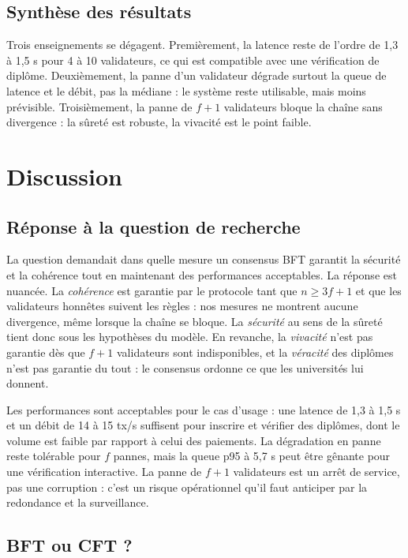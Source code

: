 \documentclass[conference]{IEEEtran}
\begin{document}
\subsection{Synthèse des résultats}

Trois enseignements se dégagent. Premièrement, la latence reste de l'ordre de 1,3 à 1,5 s pour 4 à 10 validateurs, ce qui est compatible avec une vérification de diplôme. Deuxièmement, la panne d'un validateur dégrade surtout la queue de latence et le débit, pas la médiane : le système reste utilisable, mais moins prévisible. Troisièmement, la panne de $f+1$ validateurs bloque la chaîne sans divergence : la sûreté est robuste, la vivacité est le point faible.

\section{Discussion}
\label{sec:discussion}

\subsection{Réponse à la question de recherche}

La question demandait dans quelle mesure un consensus BFT garantit la sécurité et la cohérence tout en maintenant des performances acceptables. La réponse est nuancée. La \emph{cohérence} est garantie par le protocole tant que $n \geq 3f+1$ et que les validateurs honnêtes suivent les règles : nos mesures ne montrent aucune divergence, même lorsque la chaîne se bloque. La \emph{sécurité} au sens de la sûreté tient donc sous les hypothèses du modèle. En revanche, la \emph{vivacité} n'est pas garantie dès que $f+1$ validateurs sont indisponibles, et la \emph{véracité} des diplômes n'est pas garantie du tout : le consensus ordonne ce que les universités lui donnent.

Les performances sont acceptables pour le cas d'usage : une latence de 1,3 à 1,5 s et un débit de 14 à 15 tx/s suffisent pour inscrire et vérifier des diplômes, dont le volume est faible par rapport à celui des paiements. La dégradation en panne reste tolérable pour $f$ pannes, mais la queue p95 à 5,7 s peut être gênante pour une vérification interactive. La panne de $f+1$ validateurs est un arrêt de service, pas une corruption : c'est un risque opérationnel qu'il faut anticiper par la redondance et la surveillance.

\subsection{BFT ou CFT ?}
\end{document}
